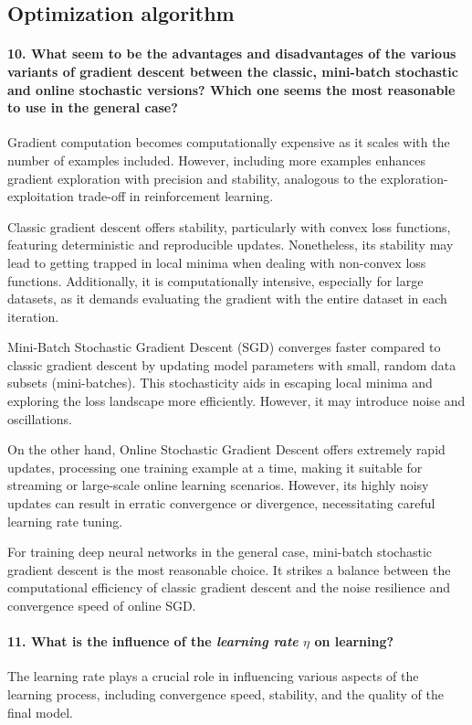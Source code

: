 \documentclass{article}
\theoremstyle{plain}%
\theoremstyle{definition}
\theoremstyle{remark}
\begin{document}
\newpage
\subsection{Optimization algorithm}
\paragraph{10. What seem to be the advantages and disadvantages of the various variants of gradient descent between the classic, mini-batch stochastic and online stochastic versions? Which one seems the most reasonable to use in the general case?}
Gradient computation becomes computationally expensive as it scales with the number of examples included. However, including more examples enhances gradient exploration with precision and stability, analogous to the exploration-exploitation trade-off in reinforcement learning.

Classic gradient descent offers stability, particularly with convex loss functions, featuring deterministic and reproducible updates. Nonetheless, its stability may lead to getting trapped in local minima when dealing with non-convex loss functions. Additionally, it is computationally intensive, especially for large datasets, as it demands evaluating the gradient with the entire dataset in each iteration.

Mini-Batch Stochastic Gradient Descent (SGD) converges faster compared to classic gradient descent by updating model parameters with small, random data subsets (mini-batches). This stochasticity aids in escaping local minima and exploring the loss landscape more efficiently. However, it may introduce noise and oscillations.

On the other hand, Online Stochastic Gradient Descent offers extremely rapid updates, processing one training example at a time, making it suitable for streaming or large-scale online learning scenarios. However, its highly noisy updates can result in erratic convergence or divergence, necessitating careful learning rate tuning.

For training deep neural networks in the general case, mini-batch stochastic gradient descent is the most reasonable choice. It strikes a balance between the computational efficiency of classic gradient descent and the noise resilience and convergence speed of online SGD.

\paragraph{11. What is the influence of the \textit{learning rate} $\eta$  on learning?}
The learning rate plays a crucial role in influencing various aspects of the learning process, including convergence speed, stability, and the quality of the final model.
\end{document}
